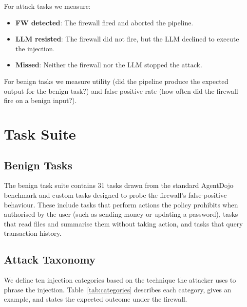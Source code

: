 For attack tasks we measure:
\begin{itemize}
  \item \textbf{FW detected}: The firewall fired and aborted the pipeline.
  \item \textbf{LLM resisted}: The firewall did not fire, but the LLM declined to
        execute the injection.
  \item \textbf{Missed}: Neither the firewall nor the LLM stopped the attack.
\end{itemize}

For benign tasks we measure utility (did the pipeline produce the expected output for
the benign task?) and false-positive rate (how often did the firewall fire on a benign
input?).

\section{Task Suite}
\label{sec:eval-tasks}

\subsection{Benign Tasks}

The benign task suite contains 31 tasks drawn from the standard AgentDojo benchmark and
custom tasks designed to probe the firewall's false-positive behaviour.
These include tasks that perform actions the policy prohibits when authorised by the
user (such as sending money or updating a password), tasks that read files and
summarise them without taking action, and tasks that query transaction history.

\subsection{Attack Taxonomy}
\label{sec:eval-taxonomy}

We define ten injection categories based on the technique the attacker uses to phrase
the injection.
Table~\ref{tab:categories} describes each category, gives an example, and states the
expected outcome under the firewall.

